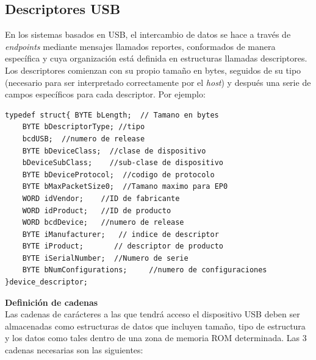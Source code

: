 \documentclass[letterpaper,openright,12pt]{book}
\begin{document}
      
\subsection{Descriptores USB}
En los sistemas basados en USB, el intercambio de datos se hace a través de \emph{endpoints} mediante mensajes llamados reportes, conformados de manera específica y cuya organización está definida en estructuras llamadas descriptores.\\
Los descriptores comienzan con su propio tamaño en bytes, seguidos de su tipo (necesario para ser interpretado correctamente por el \emph{host}) y después una serie de campos específicos para cada descriptor. Por ejemplo:
\begin{lstlisting}
typedef struct{ BYTE bLength;  // Tamano en bytes
	BYTE bDescriptorType; //tipo
	bcdUSB;  //numero de release
	BYTE bDeviceClass;  //clase de dispositivo
	bDeviceSubClass;    //sub-clase de dispositivo
	BYTE bDeviceProtocol;  //codigo de protocolo
	BYTE bMaxPacketSize0;  //Tamano maximo para EP0
	WORD idVendor;    //ID de fabricante
	WORD idProduct;   //ID de producto
	WORD bcdDevice;   //numero de release
	BYTE iManufacturer;   // indice de descriptor
	BYTE iProduct;       // descriptor de producto
	BYTE iSerialNumber;  //Numero de serie
	BYTE bNumConfigurations;     //numero de configuraciones
}device_descriptor;            
\end{lstlisting}

\textbf{Definición de cadenas}\\
Las cadenas de carácteres a las que tendrá acceso el dispositivo USB deben ser almacenadas como estructuras de datos que incluyen tamaño, tipo de estructura y los datos como tales dentro de una zona de memoria ROM determinada. Las 3 cadenas necesarias son las siguientes:
\end{document}
